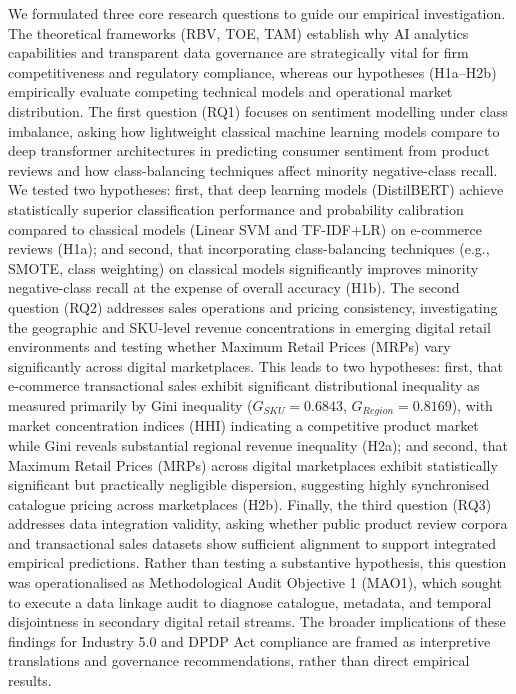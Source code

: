 \documentclass[authoryear,review,3p,times,12pt]{elsarticle}
\begin{document}
We formulated three core research questions to guide our empirical investigation. The theoretical frameworks (RBV, TOE, TAM) establish why AI analytics capabilities and transparent data governance are strategically vital for firm competitiveness and regulatory compliance, whereas our hypotheses (H1a–H2b) empirically evaluate competing technical models and operational market distribution. The first question (RQ1) focuses on sentiment modelling under class imbalance, asking how lightweight classical machine learning models compare to deep transformer architectures in predicting consumer sentiment from product reviews and how class-balancing techniques affect minority negative-class recall. We tested two hypotheses: first, that deep learning models (DistilBERT) achieve statistically superior classification performance and probability calibration compared to classical models (Linear SVM and TF-IDF+LR) on e-commerce reviews (H1a); and second, that incorporating class-balancing techniques (e.g., SMOTE, class weighting) on classical models significantly improves minority negative-class recall at the expense of overall accuracy (H1b). The second question (RQ2) addresses sales operations and pricing consistency, investigating the geographic and SKU-level revenue concentrations in emerging digital retail environments and testing whether Maximum Retail Prices (MRPs) vary significantly across digital marketplaces. This leads to two hypotheses: first, that e-commerce transactional sales exhibit significant distributional inequality as measured primarily by Gini inequality ($G_{SKU} = 0.6843$, $G_{Region} = 0.8169$), with market concentration indices (HHI) indicating a competitive product market while Gini reveals substantial regional revenue inequality (H2a); and second, that Maximum Retail Prices (MRPs) across digital marketplaces exhibit statistically significant but practically negligible dispersion, suggesting highly synchronised catalogue pricing across marketplaces (H2b). Finally, the third question (RQ3) addresses data integration validity, asking whether public product review corpora and transactional sales datasets show sufficient alignment to support integrated empirical predictions. Rather than testing a substantive hypothesis, this question was operationalised as Methodological Audit Objective 1 (MAO1), which sought to execute a data linkage audit to diagnose catalogue, metadata, and temporal disjointness in secondary digital retail streams. The broader implications of these findings for Industry 5.0 and DPDP Act compliance are framed as interpretive translations and governance recommendations, rather than direct empirical results.
\end{document}

